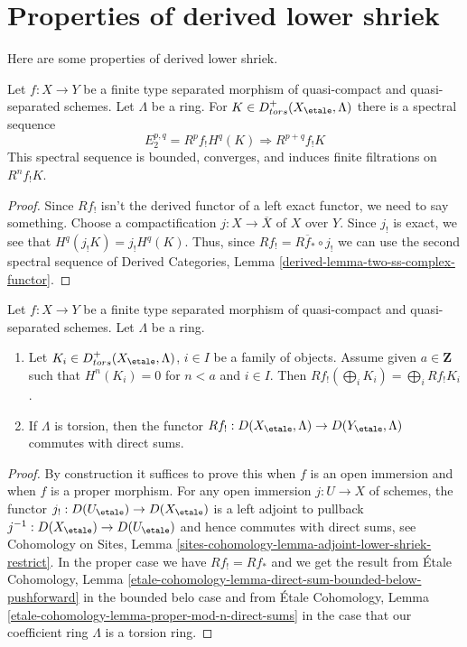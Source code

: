 \section{Properties of derived lower shriek}
\label{section-derived-lower-shriek-properties}

\noindent
Here are some properties of derived lower shriek.

\begin{lemma}
\label{lemma-two-ss-complex-functor}
Let $f : X \to Y$ be a finite type separated morphism of quasi-compact
and quasi-separated schemes. Let $\Lambda$ be a ring. For
$K \in D^+_{tors}(X_\etale, \Lambda)$ there is a spectral sequence
$$
E^{p, q}_2 = R^pf_!H^q(K) \Rightarrow R^{p + q}f_!K
$$
This spectral sequence is bounded, converges, and
induces finite filtrations on $R^nf_!K$.
\end{lemma}

\begin{proof}
Since $Rf_!$ isn't the derived functor of a left exact functor, we need
to say something. Choose a compactification $j : X \to \overline{X}$
of $X$ over $Y$. Since $j_!$ is exact, we see that
$H^q(j_!K) = j_!H^q(K)$. Thus, since $Rf_! = R\overline{f}_* \circ j_!$
we can use the second spectral sequence of
Derived Categories, Lemma \ref{derived-lemma-two-ss-complex-functor}.
\end{proof}

\begin{lemma}
\label{lemma-derived-lower-shriek-commute-direct-sums}
Let $f : X \to Y$ be a finite type separated morphism of quasi-compact
and quasi-separated schemes. Let $\Lambda$ be a ring.
\begin{enumerate}
\item Let $K_i \in D^+_{tors}(X_\etale, \Lambda)$, $i \in I$ be a family
of objects. Assume given $a \in \mathbf{Z}$ such that
$H^n(K_i) = 0$ for $n < a$ and $i \in I$. Then $Rf_!(\bigoplus_i K_i) =
\bigoplus_i Rf_!K_i$.
\item If $\Lambda$ is torsion, then the functor
$Rf_! : D(X_\etale, \Lambda) \to D(Y_\etale, \Lambda)$
commutes with direct sums.
\end{enumerate}
\end{lemma}

\begin{proof}
By construction it suffices to prove this when $f$ is an open immersion
and when $f$ is a proper morphism. For any open immersion $j : U \to X$
of schemes, the functor $j_! : D(U_\etale) \to D(X_\etale)$ is a left
adjoint to pullback $j^{-1} : D(X_\etale) \to D(U_\etale)$
and hence commutes with direct sums, see Cohomology on Sites, Lemma
\ref{sites-cohomology-lemma-adjoint-lower-shriek-restrict}.
In the proper case we have $Rf_! = Rf_*$ and we get the result from
\'Etale Cohomology, Lemma
\ref{etale-cohomology-lemma-direct-sum-bounded-below-pushforward}
in the bounded belo case and from
\'Etale Cohomology, Lemma \ref{etale-cohomology-lemma-proper-mod-n-direct-sums}
in the case that our coefficient ring $\Lambda$ is a torsion ring.
\end{proof}

